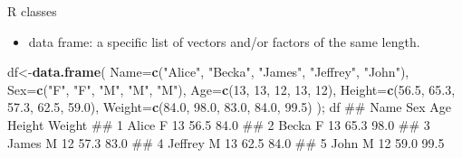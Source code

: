 \documentclass[ignorenonframetext,]{beamer}
\newenvironment{Shaded}{\begin{snugshade}}{\end{snugshade}}
\newcommand{\KeywordTok}[1]{\textcolor[rgb]{0.13,0.29,0.53}{\textbf{{#1}}}}
\newcommand{\DataTypeTok}[1]{\textcolor[rgb]{0.13,0.29,0.53}{{#1}}}
\newcommand{\DecValTok}[1]{\textcolor[rgb]{0.00,0.00,0.81}{{#1}}}
\newcommand{\FloatTok}[1]{\textcolor[rgb]{0.00,0.00,0.81}{{#1}}}
\newcommand{\StringTok}[1]{\textcolor[rgb]{0.31,0.60,0.02}{{#1}}}
\newcommand{\NormalTok}[1]{{#1}}
\begin{document}
\begin{frame}[fragile]{R classes}

\begin{itemize}
\itemsep1pt\parskip0pt
\item
  data frame: a specific list of vectors and/or factors of the same
  length.
\end{itemize}

\begin{Shaded}
\begin{Highlighting}[]
 \NormalTok{df<-}\KeywordTok{data.frame}\NormalTok{(}
\DataTypeTok{Name=}\KeywordTok{c}\NormalTok{(}\StringTok{"Alice"}\NormalTok{, }\StringTok{"Becka"}\NormalTok{, }\StringTok{"James"}\NormalTok{, }\StringTok{"Jeffrey"}\NormalTok{, }\StringTok{"John"}\NormalTok{),}
\DataTypeTok{Sex=}\KeywordTok{c}\NormalTok{(}\StringTok{"F"}\NormalTok{, }\StringTok{"F"}\NormalTok{, }\StringTok{"M"}\NormalTok{, }\StringTok{"M"}\NormalTok{, }\StringTok{"M"}\NormalTok{),}
\DataTypeTok{Age=}\KeywordTok{c}\NormalTok{(}\DecValTok{13}\NormalTok{, }\DecValTok{13}\NormalTok{, }\DecValTok{12}\NormalTok{, }\DecValTok{13}\NormalTok{, }\DecValTok{12}\NormalTok{),}
\DataTypeTok{Height=}\KeywordTok{c}\NormalTok{(}\FloatTok{56.5}\NormalTok{, }\FloatTok{65.3}\NormalTok{, }\FloatTok{57.3}\NormalTok{, }\FloatTok{62.5}\NormalTok{, }\FloatTok{59.0}\NormalTok{),}
\DataTypeTok{Weight=}\KeywordTok{c}\NormalTok{(}\FloatTok{84.0}\NormalTok{, }\FloatTok{98.0}\NormalTok{, }\FloatTok{83.0}\NormalTok{, }\FloatTok{84.0}\NormalTok{, }\FloatTok{99.5}\NormalTok{)}
\NormalTok{); df}
\NormalTok{##      Name Sex Age Height Weight}
\NormalTok{## 1   Alice   F  13   56.5   84.0}
\NormalTok{## 2   Becka   F  13   65.3   98.0}
\NormalTok{## 3   James   M  12   57.3   83.0}
\NormalTok{## 4 Jeffrey   M  13   62.5   84.0}
\NormalTok{## 5    John   M  12   59.0   99.5}
\end{Highlighting}
\end{Shaded}

\end{frame}
\end{document}
